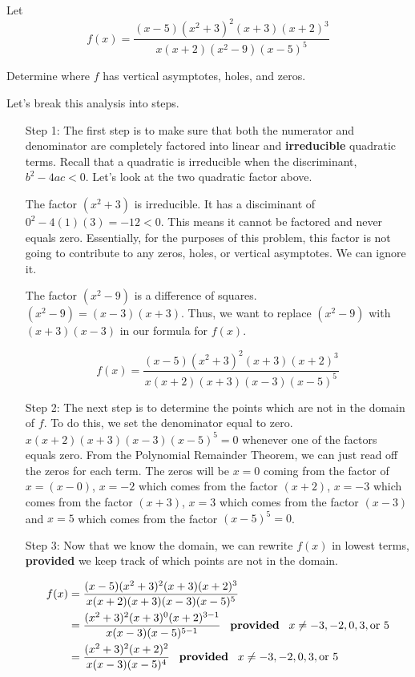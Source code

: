 \documentclass{ximera}
\begin{document}
\begin{example}
 Let $$f(x)=\frac{(x-5)(x^2+3)^2(x+3)(x+2)^3}{x(x+2)(x^2-9)(x-5)^5}$$

Determine where $f$ has vertical asymptotes, holes, and zeros.
\begin{explanation}
Let's break this analysis into steps.

\begin{enumerate}

\item[Step 1:] The first step is to make sure that both the numerator and denominator are completely factored into linear and \textbf{irreducible} quadratic terms.  Recall that a quadratic is irreducible when the discriminant, $b^2-4ac<0$.  Let's look at the two quadratic factor above.  

The factor $(x^2+3)$ is irreducible.  It has a disciminant of $0^2-4(1)(3)=-12<0$.  This means it cannot be factored and never equals zero.  Essentially, for the purposes of this problem, this factor is not going to contribute to any zeros, holes, or vertical asymptotes.  We can ignore it.

The factor $(x^2-9)$ is a difference of squares.  $(x^2-9)=(x-3)(x+3)$.  Thus, we want to replace $(x^2-9)$ with $(x+3)(x-3)$ in our formula for $f(x)$.

$$f(x)=\frac{(x-5)(x^2+3)^2(x+3)(x+2)^3}{x(x+2)(x+3)(x-3)(x-5)^5}$$

\item[Step 2:] The next step is to determine the points which are not in the domain of $f$.  To do this, we set the denominator equal to zero.  $x(x+2)(x+3)(x-3)(x-5)^5=0$ whenever one of the factors equals zero.  From the Polynomial Remainder Theorem, we can just read off the zeros for each term.  The zeros will be $x=0$ coming from the factor of $x=(x-0)$, $x=-2$ which comes from the factor $(x+2)$, $x=-3$ which comes from the factor $(x+3)$, $x=3$ which comes from the factor $(x-3)$ and $x=5$ which comes from the factor $(x-5)^5=0$.

\item[Step 3:]  Now that we know the domain, we can rewrite $f(x)$ in lowest terms, \textbf{provided} we keep track of which points are not in the domain.

\begin{align*}
f(x)&=\frac{(x-5)(x^2+3)^2(x+3)(x+2)^3}{x(x+2)(x+3)(x-3)(x-5)^5}\\
&=\frac{(x^2+3)^2(x+3)^{0}(x+2)^{3-1}}{x(x-3)(x-5)^{5-1}}  \text{\,\,\, \textbf{provided} \, } x \neq -3, -2, 0, 3, \text{or} \, \, 5 \\
&=\frac{(x^2+3)^2(x+2)^{2}}{x(x-3)(x-5)^{4}}  \text{\,\,\, \textbf{provided} \, } x \neq -3, -2, 0, 3, \text{or} \, \, 5  \\
\end{align*}


\end{enumerate}
\end{explanation}
\end{example}
\end{document}
